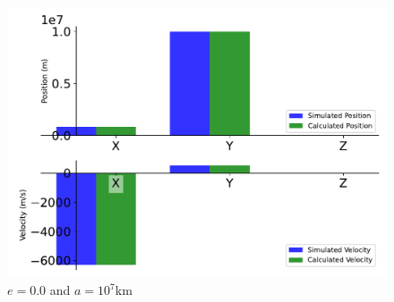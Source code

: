 \begin{figure}[htbp]\centerline{\includegraphics[height=0.7\textwidth, keepaspectratio]{AutoTeX/EquCirc_1}}\caption{$e = 0.0$ and $a = 10^7$km}\label{fig:EquCirc_1}\end{figure}